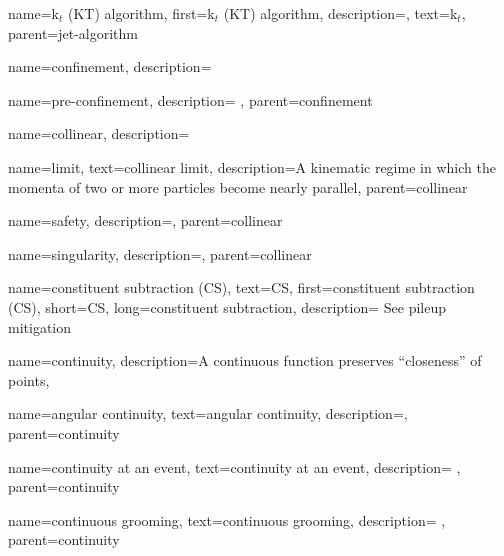     {
        name=k\(_t\) (KT) algorithm,
        first={k\(_t\) (KT) algorithm},
        description={},
        text={k\(_t\)},
        parent=jet-algorithm
    }



{
    name=confinement,
    description={
    }
}

    {
        name=pre-confinement,
        description={
        },
        parent=confinement
    }




{
    name=collinear,
    description={}
}

    {
        name=limit,
        text=collinear limit,
        description={A kinematic regime in which the momenta of two or more particles become nearly parallel},
        parent=collinear
    }


    {
        name=safety,
        description={},
        parent=collinear
    }

    {
        name=singularity,
        description={},
        parent=collinear
    }



{
    name=constituent subtraction (CS),
    text=CS,
    first=constituent subtraction (CS),
    short=CS,
    long=constituent subtraction,
    description={
        See pileup mitigation
    }
}


{
  name=continuity,
  description={A continuous function preserves ``closeness'' of points},
}

    {
        name=angular continuity,
        text=angular continuity,
        description={},
        parent=continuity
    }


    {
        name=continuity at an event,
        text=continuity at an event,
        description={
        },
        parent=continuity
    }

    {
        name=continuous grooming,
        text=continuous grooming,
        description={
        },
        parent=continuity
    }


